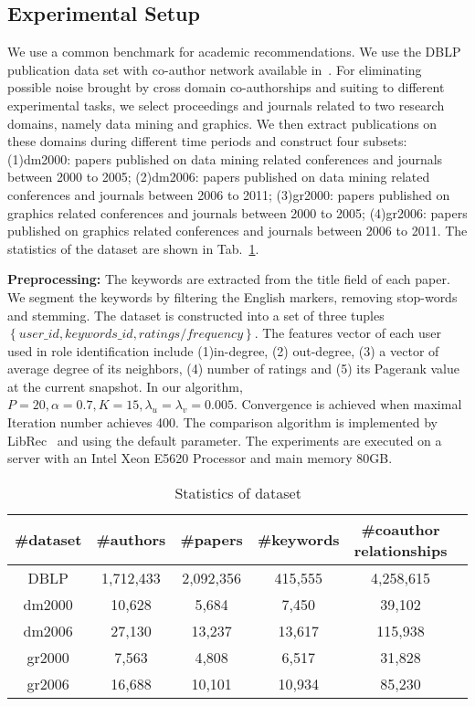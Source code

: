 \documentclass{ieeeaccess}
\begin{document}
\subsection{Experimental Setup}
We use a common benchmark for academic recommendations. We use the DBLP publication data set with  co-author network available in~\cite{Tang2008ArnetMiner}. For eliminating possible noise brought by cross domain co-authorships and suiting to different experimental tasks, we select proceedings and journals related to two research domains,  namely data mining and graphics. We then extract publications on these domains during different time periods and construct four subsets: (1)dm2000: papers published on data mining related conferences and journals between 2000 to 2005; (2)dm2006: papers published on data mining related conferences and journals between 2006 to 2011; (3)gr2000: papers published on graphics related conferences and journals between 2000 to 2005; (4)gr2006: papers published on graphics related conferences and journals between 2006 to 2011. The statistics of the dataset are shown in Tab.~\ref{tab:statistics}.

\textbf{Preprocessing:} The keywords are extracted from the title field of each paper. We segment the keywords by filtering the English markers, removing stop-words and stemming. The dataset is constructed into a set of three tuples $\left\{user\_id, keywords\_id, ratings/frequency \right\}$. The features vector of each user used in role identification include (1)in-degree, (2) out-degree, (3) a vector of average degree of its neighbors, (4) number of ratings and (5) its Pagerank value at the current snapshot. In our algorithm, $P=20,\alpha=0.7, K=15, \lambda_u=\lambda_v=0.005$. Convergence is achieved when maximal Iteration number achieves 400. The comparison algorithm is implemented by LibRec~\cite{Guo2015LibRec} and using the default parameter. The experiments are executed on a server with an Intel Xeon E5620 Processor and main memory 80GB.

\begin{table}[htbp]
\caption{Statistics of dataset}\centering
\begin{tabular}{|c|c|c|c|c|c|}
\hline
\#dataset & \#authors & \#papers & \#keywords & \#coauthor relationships \\\hline
DBLP&1,712,433 & 2,092,356 & 415,555 & 4,258,615 \\\hline
dm2000& 10,628& 5,684& 7,450& 39,102\\\hline
dm2006& 27,130& 13,237& 13,617& 115,938\\\hline
gr2000& 7,563& 4,808& 6,517& 31,828\\\hline
gr2006& 16,688& 10,101& 10,934& 85,230\\\hline
\end{tabular}\label{tab:statistics}
\end{table}
\end{document}
